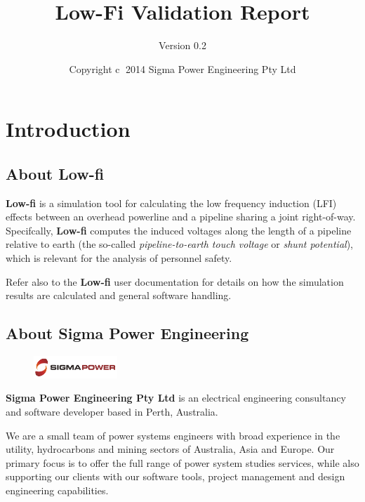\documentclass{article}
\title{Low-Fi Validation Report}
\author{Version 0.2}
\date{Copyright \textcircled{c}  2014 Sigma Power Engineering Pty Ltd}
\begin{document}
\pagestyle{plain}
\maketitle

\tableofcontents
\clearpage

\section{Introduction}
\subsection{About Low-fi}
\textbf{Low-fi} is a simulation tool for calculating the low frequency induction (LFI) effects between an overhead powerline and a pipeline sharing a joint right-of-way. Specifcally, \textbf{Low-fi} computes the induced voltages along the length of a pipeline relative to earth (the so-called \emph{pipeline-to-earth touch voltage} or \emph{shunt potential}), which is relevant for the analysis of personnel safety.

Refer also to the \textbf{Low-fi} user documentation for details on how the simulation results are calculated and general software handling. 

\subsection{About Sigma Power Engineering}
\begin{figure}[!ht]
    \includegraphics[width=0.28\textwidth]{./Figures/Sigma_Power.png}
\end{figure}


\textbf{Sigma Power Engineering Pty Ltd} is an electrical engineering consultancy and software developer based in Perth, Australia.

We are a small team of power systems engineers with broad experience in the utility, hydrocarbons and mining sectors of Australia, Asia and Europe. Our primary focus is to offer the full range of power system studies services, while also supporting our clients with our software tools, project management and design engineering capabilities.
\end{document}
